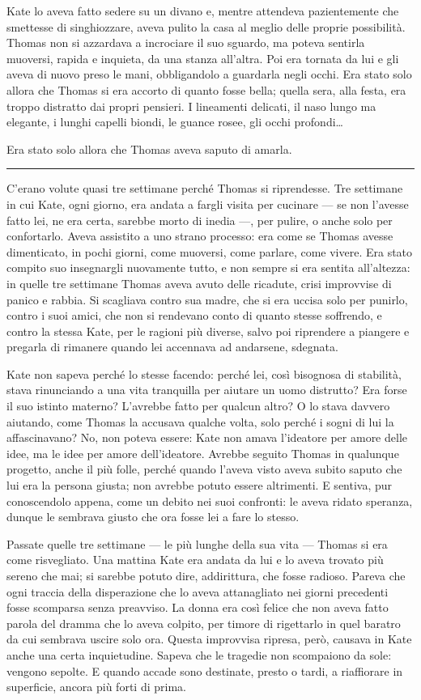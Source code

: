 \documentclass[a4paper,oneside,11pt]{memoir}
\begin{document}
Kate lo aveva fatto sedere su un divano e, mentre attendeva pazientemente che smettesse di singhiozzare, aveva pulito la
casa al meglio delle proprie possibilità. Thomas non si azzardava a incrociare il suo sguardo, ma poteva sentirla
muoversi, rapida e inquieta, da una stanza all'altra. Poi era tornata da lui e gli aveva di nuovo preso le mani,
obbligandolo a guardarla negli occhi. Era stato solo allora che Thomas si era accorto di quanto fosse bella; quella
sera, alla festa, era troppo distratto dai propri pensieri. I lineamenti delicati, il naso lungo ma elegante, i lunghi
capelli biondi, le guance rosee, gli occhi profondi\dots{}

Era stato solo allora che Thomas aveva saputo di amarla.

\plainbreak{1}

C'erano volute quasi tre settimane perché Thomas si riprendesse. Tre settimane in cui Kate, ogni giorno, era andata a
fargli visita per cucinare --- se non l'avesse fatto lei, ne era certa, sarebbe morto di inedia ---, per pulire, o anche
solo per confortarlo. Aveva assistito a uno strano processo: era come se Thomas avesse dimenticato, in pochi giorni,
come muoversi, come parlare, come vivere. Era stato compito suo insegnargli nuovamente tutto, e non sempre si era
sentita all'altezza: in quelle tre settimane Thomas aveva avuto delle ricadute, crisi improvvise di panico e rabbia. Si
scagliava contro sua madre, che si era uccisa solo per punirlo, contro i suoi amici, che non si rendevano conto di
quanto stesse soffrendo, e contro la stessa Kate, per le ragioni più diverse, salvo poi riprendere a piangere e pregarla
di rimanere quando lei accennava ad andarsene, sdegnata.

Kate non sapeva perché lo stesse facendo: perché lei, così bisognosa di stabilità, stava rinunciando a una vita
tranquilla per aiutare un uomo distrutto? Era forse il suo istinto materno? L'avrebbe fatto per qualcun altro? O lo
stava davvero aiutando, come Thomas la accusava qualche volta, solo perché i sogni di lui la affascinavano? No, non
poteva essere: Kate non amava l'ideatore per amore delle idee, ma le idee per amore dell'ideatore. Avrebbe seguito
Thomas in qualunque progetto, anche il più folle, perché quando l'aveva visto aveva subito saputo che lui era la persona
giusta; non avrebbe potuto essere altrimenti. E sentiva, pur conoscendolo appena, come un debito nei suoi confronti: le
aveva ridato speranza, dunque le sembrava giusto che ora fosse lei a fare lo stesso.

Passate quelle tre settimane --- le più lunghe della sua vita --- Thomas si era come risvegliato. Una mattina Kate era
andata da lui e lo aveva trovato più sereno che mai; si sarebbe potuto dire, addirittura, che fosse radioso. Pareva che
ogni traccia della disperazione che lo aveva attanagliato nei giorni precedenti fosse scomparsa senza preavviso. La
donna era così felice che non aveva fatto parola del dramma che lo aveva colpito, per timore di rigettarlo in quel
baratro da cui sembrava uscire solo ora. Questa improvvisa ripresa, però, causava in Kate anche una certa inquietudine.
Sapeva che le tragedie non scompaiono da sole: vengono sepolte. E quando accade sono destinate, presto o tardi, a
riaffiorare in superficie, ancora più forti di prima.
\end{document}
